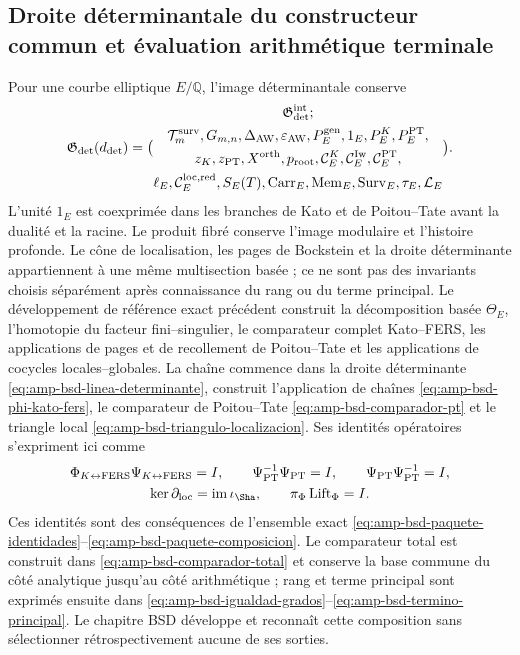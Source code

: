 \subsection{Droite déterminantale du constructeur commun et évaluation arithmétique terminale}

Pour une courbe elliptique $E/\mathbb Q$, l’image déterminantale conserve
\begin{equation}\label{eq:pdf2-g-det-explicito}
 \mathfrak G_{\rm det}(d_{\rm det})=
 \bigl(
 \begin{gathered}
  \mathfrak G_{\rm det}^{\rm int};\\
  \mathcal T_m^{\rm surv},G_{m,n},\Delta_{\rm AW},\varepsilon_{\rm AW},
  P_E^{\rm gen},1_E,P_E^K,P_E^{\rm PT},\\
  z_K,z_{\rm PT},X^{\rm orth},p_{\rm root},
  \mathcal C_E^K,\mathcal C_E^{\rm Iw},\mathcal C_E^{\rm PT},\\
  \ell_E,\mathcal C_E^{\rm loc,red},S_E(T),
  \operatorname{Carr}_E,\operatorname{Mem}_E,
  \operatorname{Surv}_E,\tau_E,\mathcal L_E
 \end{gathered}
 \bigr).
\end{equation}
L’unité $1_E$ est coexprimée dans les branches de Kato et de Poitou--Tate avant la dualité et la racine. Le produit fibré conserve l’image modulaire et l’histoire profonde. Le cône de localisation, les pages de Bockstein et la droite déterminante appartiennent à une même multisection basée ; ce ne sont pas des invariants choisis séparément après connaissance du rang ou du terme principal. Le développement de référence exact précédent construit la décomposition basée $\Theta_E$, l’homotopie du facteur fini--singulier, le comparateur complet Kato--FERS, les applications de pages et de recollement de Poitou--Tate et les applications de cocycles locales--globales. La chaîne commence dans la droite déterminante \eqref{eq:amp-bsd-linea-determinante}, construit l’application de chaînes \eqref{eq:amp-bsd-phi-kato-fers}, le comparateur de Poitou--Tate \eqref{eq:amp-bsd-comparador-pt} et le triangle local \eqref{eq:amp-bsd-triangulo-localizacion}. Ses identités opératoires s’expriment ici comme
\begin{equation}\label{eq:pdf2-g-det-identidades-dato}
\begin{gathered}
 \Phi_{K\leftrightarrow{\rm FERS}}\Psi_{K\leftrightarrow{\rm FERS}}=I,
 \qquad
 \Psi_{\rm PT}^{-1}\Psi_{\rm PT}=I,
 \qquad
 \Psi_{\rm PT}\Psi_{\rm PT}^{-1}=I,\\
 \ker\partial_{\rm loc}=\operatorname{im}\iota_{\Sha},
 \qquad
 \pi_\Phi\operatorname{Lift}_\Phi=I.
\end{gathered}
\end{equation}
Ces identités sont des conséquences de l’ensemble exact \eqref{eq:amp-bsd-paquete-identidades}--\eqref{eq:amp-bsd-paquete-composicion}. Le comparateur total est construit dans \eqref{eq:amp-bsd-comparador-total} et conserve la base commune du côté analytique jusqu’au côté arithmétique ; rang et terme principal sont exprimés ensuite dans \eqref{eq:amp-bsd-igualdad-grados}--\eqref{eq:amp-bsd-termino-principal}. Le chapitre BSD développe et reconnaît cette composition sans sélectionner rétrospectivement aucune de ses sorties.

